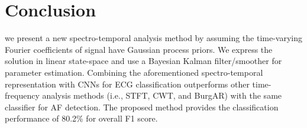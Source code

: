\documentclass[portrait,a0,final]{a0poster} %
\begin{document}
\begin{minipage}{0.98\linewidth}
\begin{minipage}[t]{0.47\linewidth}
\section{Conclusion}
\setlength{\parindent}{10mm}
we present a new spectro-temporal analysis method by assuming the time-varying Fourier coefficients of signal have Gaussian process priors. We express the solution in linear state-space and use a Bayesian Kalman filter/smoother for parameter estimation. Combining the aforementioned spectro-temporal representation with CNNs for ECG classification outperforms other time-frequency analysis methods (i.e., STFT, CWT, and BurgAR) with the same classifier for AF detection. The proposed method provides the classification performance of 80.2\% for overall F1 score. 



{\footnotesize %





} %



\end{minipage}
\end{minipage} %





\vfill %


%
%
%
%
%
%
%
%
%
%




\vspace*{0.03\linewidth} %
\end{document}
